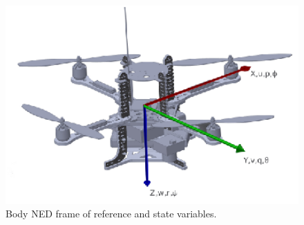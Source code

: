 \documentclass[a4paper,11pt]{report}
\begin{document}
\begin{figure}[htbp]
 \begin{center}
 \includegraphics[width=14cm]{./axes.eps}
\caption{Body NED frame of reference and state variables.\label{fig:axes}}
\end{center}
\end{figure} 
\end{document}
